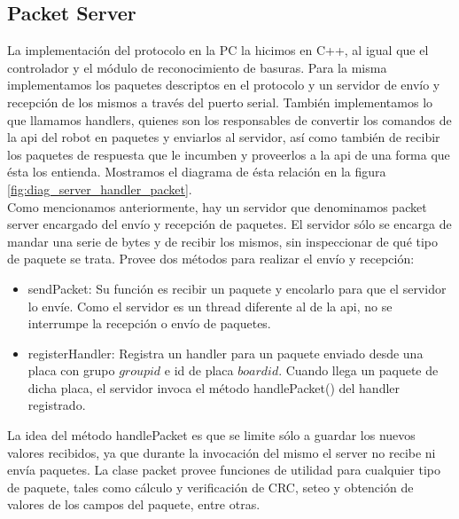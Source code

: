 \subsection{Packet Server}
La implementaci\'on del protocolo en la PC la hicimos en C++, al igual que
el controlador y el m\'odulo de reconocimiento de basuras. Para la misma
implementamos los paquetes descriptos en el protocolo y un servidor de
env\'io y recepci\'on de los mismos a trav\'es del puerto serial. Tambi\'en
implementamos lo que llamamos handlers, quienes son los responsables de
convertir los comandos de la api del robot en paquetes y enviarlos al
servidor, as\'i como tambi\'en de recibir los paquetes de respuesta que
le incumben y proveerlos a la api de una forma que \'esta los entienda.
Mostramos el diagrama de \'esta relaci\'on en la figura
\ref{fig:diag_server_handler_packet}.
\\\indent
Como mencionamos anteriormente, hay un servidor que denominamos packet
server encargado del env\'io y recepci\'on de paquetes. El servidor s\'olo
se encarga de mandar una serie de bytes y de recibir los mismos, sin
inspeccionar de qu\'e tipo de paquete se trata. Provee
dos m\'etodos para realizar el env\'io y recepci\'on:
\begin{itemize}
	\item{sendPacket:} Su funci\'on es recibir un paquete y encolarlo para
		que el servidor lo env\'ie. Como el servidor es un thread diferente
		al de la api, no se interrumpe la recepci\'on o env\'io de paquetes.
	\item{registerHandler:} Registra un handler para un paquete enviado desde
		una placa con grupo $groupid$ e id de placa $boardid$. Cuando llega
		un paquete de dicha placa, el servidor invoca el m\'etodo
		handlePacket() del handler registrado.
\end{itemize}
La idea del m\'etodo handlePacket es que se limite s\'olo a guardar los
nuevos valores recibidos, ya que durante la invocaci\'on del mismo el
server no recibe ni env\'ia paquetes.
La clase packet provee funciones de utilidad para cualquier tipo de
paquete, tales como c\'alculo y verificaci\'on de CRC, seteo y obtenci\'on
de valores de los campos del paquete, entre otras.
